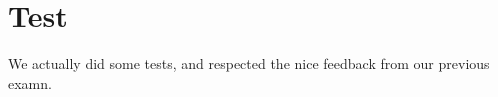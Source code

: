\section{Test}
We actually did some tests, and respected the nice feedback from our previous examn.
